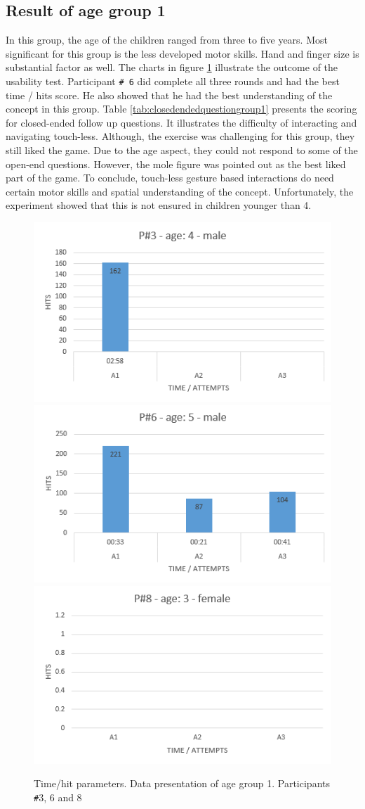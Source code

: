 \subsection{Result of age group 1}
In this group, the age of the children ranged from three to five years. Most significant for this group is the less developed motor skills. Hand and finger size is substantial factor as well. 
The charts in figure \ref{fig:agegroup1} illustrate the outcome of the usability test. Participant \texttt{\# 6} did complete all three rounds and had the best time / hits score. He also showed that he had the best understanding of the concept in this group.
Table \ref{tab:closedendedquestiongroup1} presents the scoring for closed-ended follow up questions. It illustrates the difficulty of interacting and navigating touch-less. Although, the exercise was challenging for this group, they still liked the game.
Due to the age aspect, they could not respond to some of the open-end questions. However, the mole figure was pointed out as the best liked part of the game.
To conclude, touch-less gesture based interactions do need certain motor skills and spatial understanding of the concept. Unfortunately, the experiment showed that this is not ensured in children younger than 4.   


\begin{figure}[!ht]

    \centering
    \includegraphics[width=.6\textwidth]{figures/p3.png}
    \includegraphics[width=.6\textwidth]{figures/p6.png}
        \includegraphics[width=.6\textwidth]{figures/p8.png}
    \caption{Time/hit parameters. Data presentation of age group 1. Participants \texttt{\#}3, 6 and 8}
    \label{fig:agegroup1}
\end{figure}

